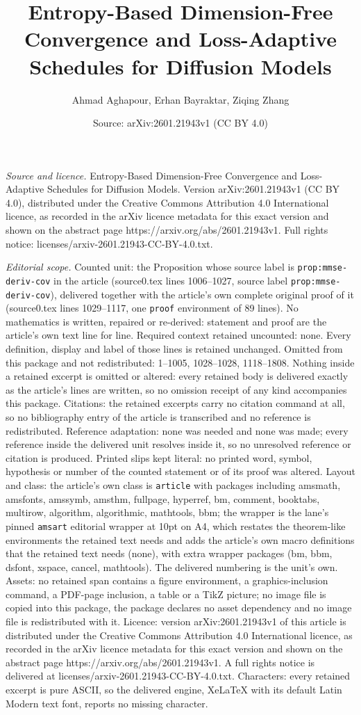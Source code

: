 \documentclass[10pt,a4paper]{amsart}
\title[Entropy-Based Dimension-Free Convergence and Loss-Adaptive S]{Entropy-Based Dimension-Free Convergence and Loss-Adaptive Schedules for Diffusion Models}
\author{Ahmad Aghapour, Erhan Bayraktar, Ziqing Zhang}
\date{Source: arXiv:2601.21943v1 (CC BY 4.0)}
\begin{document}
\maketitle

\noindent\emph{Source and licence.} Entropy-Based Dimension-Free Convergence and Loss-Adaptive Schedules for Diffusion Models. Version arXiv:2601.21943v1 (CC BY 4.0), distributed under the Creative Commons Attribution 4.0 International licence, as recorded in the arXiv licence metadata for this exact version and shown on the abstract page https://arxiv.org/abs/2601.21943v1. Full rights notice: licenses/arxiv-2601.21943-CC-BY-4.0.txt.\par\smallskip

\noindent\textit{Editorial scope.} Counted unit: the Proposition whose source label is \texttt{prop:mmse-deriv-cov} in the article (source0.tex lines 1006--1027, source label \texttt{prop:mmse-deriv-cov}), delivered together with the article's own complete original proof of it (source0.tex lines 1029--1117, one \texttt{proof} environment of 89 lines). No mathematics is written, repaired or re-derived: statement and proof are the article's own text line for line. Required context retained uncounted: none. Every definition, display and label of those lines is retained unchanged. Omitted from this package and not redistributed: 1--1005, 1028--1028, 1118--1808. Nothing inside a retained excerpt is omitted or altered: every retained body is delivered exactly as the article's lines are written, so no omission receipt of any kind accompanies this package. Citations: the retained excerpts carry no citation command at all, so no bibliography entry of the article is transcribed and no reference is redistributed. Reference adaptation: none was needed and none was made; every reference inside the delivered unit resolves inside it, so no unresolved reference or citation is produced. Printed slips kept literal: no printed word, symbol, hypothesis or number of the counted statement or of its proof was altered. Layout and class: the article's own class is \texttt{article} with packages including amsmath, amsfonts, amssymb, amsthm, fullpage, hyperref, bm, comment, booktabs, multirow, algorithm, algorithmic, mathtools, bbm; the wrapper is the lane's pinned \texttt{amsart} editorial wrapper at 10pt on A4, which restates the theorem-like environments the retained text needs and adds the article's own macro definitions that the retained text needs (none), with extra wrapper packages (bm, bbm, dsfont, xspace, cancel, mathtools). The delivered numbering is the unit's own. Assets: no retained span contains a figure environment, a graphics-inclusion command, a PDF-page inclusion, a table or a TikZ picture; no image file is copied into this package, the package declares no asset dependency and no image file is redistributed with it. Licence: version arXiv:2601.21943v1 of this article is distributed under the Creative Commons Attribution 4.0 International licence, as recorded in the arXiv licence metadata for this exact version and shown on the abstract page https://arxiv.org/abs/2601.21943v1. A full rights notice is delivered at licenses/arxiv-2601.21943-CC-BY-4.0.txt. Characters: every retained excerpt is pure ASCII, so the delivered engine, XeLaTeX with its default Latin Modern text font, reports no missing character.
\end{document}
